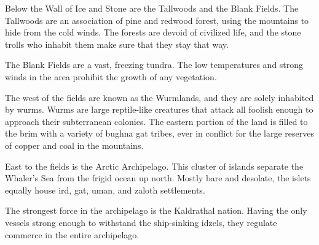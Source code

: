 Below the Wall of Ice and Stone are the Tallwoods and the Blank Fields.
The Tallwoods are an association of pine and redwood forest, using the mountains to hide from the cold winds.
The forests are devoid of civilized life, and the stone trolls who inhabit them make sure that they stay that way.

The Blank Fields are a vast, freezing tundra.
The low temperatures and strong winds in the area prohibit the growth of any vegetation.

The west of the fields are known as the Wurmlands, and they are solely inhabited by wurms.
Wurms are large reptile-like creatures that attack all foolish enough to approach their subterranean colonies.
The eastern portion of the land is filled to the brim with a variety of bughna gat tribes, ever in conflict for the large reserves of copper and coal in the mountains.

East to the fields is the Arctic Archipelago.
This cluster of islands separate the Whaler's Sea from the frigid ocean up north.
Mostly bare and desolate, the islets equally house ird, gat, uman, and zaloth settlements.

The strongest force in the archipelago is the Kaldrathal nation.
Having the only vessels strong enough to withstand the ship-sinking idzels, they regulate commerce in the entire archipelago.
